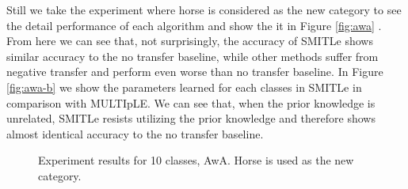 Still we take the experiment where horse is considered as the new category to see the detail performance of each algorithm and show the it in Figure \ref{fig:awa} . From here we can see that, not surprisingly, the accuracy of SMITLe shows similar accuracy to the no transfer baseline, while other methods suffer from negative transfer and perform even worse than no transfer baseline. In Figure \ref{fig:awa-b} we show the parameters learned for each classes in SMITLe in comparison with MULTIpLE. We can see that, when the prior knowledge is unrelated, SMITLe resists utilizing the prior knowledge and therefore shows almost identical accuracy to the no transfer baseline.

\begin{figure}
	\centering
	\caption{Experiment results for 10 classes, AwA. Horse is used as the new category.}
	\label{fig:a2c}
\end{figure}


